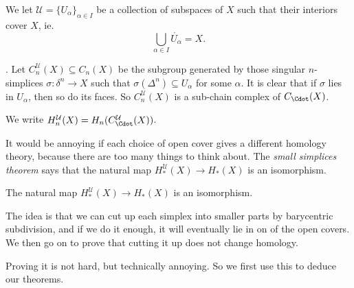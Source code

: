 \documentclass[a4paper]{article}
\begin{document}
We let $\mathcal{U} = \{U_\alpha\}_{\alpha \in I}$ be a collection of subspaces of $X$ such that their interiors cover $X$, ie.
\[
  \bigcup_{\alpha \in I} \mathring{U_\alpha} = X.
\]
\begin{defi}.
  Let $C_n^\mathcal{U}(X) \subseteq C_n(X)$ be the subgroup generated by those singular $n$-simplices $\sigma: \delta^n \to X$ such that $\sigma(\Delta^n) \subseteq U_\alpha$ for some $\alpha$. It is clear that if $\sigma$ lies in $U_\alpha$, then so do its faces. So $C_n^{\mathcal{U}}(X)$ is a sub-chain complex of $C_\Cdot(X)$.

  We write $H_n^\mathcal{U}(X) = H_n(C_\Cdot^\mathcal{U}(X))$.
\end{defi}
It would be annoying if each choice of open cover gives a different homology theory, because there are too many things to think about. The \emph{small simplices theorem} says that the natural map $H_*^\mathcal{U}(X) \to H_*(X)$ is an isomorphism.

\begin{thm}
  The natural map $H_*^\mathcal{U}(X) \to H_*(X)$ is an isomorphism.
\end{thm}

The idea is that we can cut up each simplex into smaller parts by barycentric subdivision, and if we do it enough, it will eventually lie in on of the open covers. We then go on to prove that cutting it up does not change homology.

Proving it is not hard, but technically annoying. So we first use this to deduce our theorems.
\end{document}
